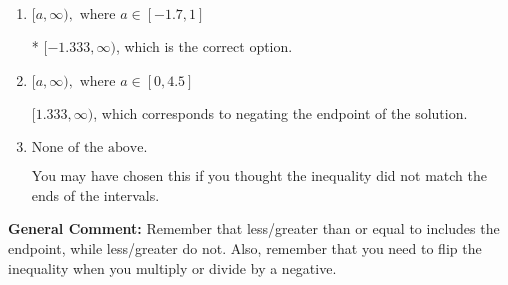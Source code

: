 \documentclass{extbook}[14pt]
\begin{document}
\begin{enumerate}
{\begin{enumerate}[label=\Alph*.]
 $(-\infty, -1.333]$, which corresponds to switching the direction of the interval. You likely did this if you did not flip the inequality when dividing by a negative!
\item \( [a, \infty), \text{ where } a \in [-1.7, 1] \)

* $[-1.333, \infty)$, which is the correct option.
\item \( [a, \infty), \text{ where } a \in [0, 4.5] \)

 $[1.333, \infty)$, which corresponds to negating the endpoint of the solution.
\item \( \text{None of the above}. \)

You may have chosen this if you thought the inequality did not match the ends of the intervals.
\end{enumerate}

\textbf{General Comment:} Remember that less/greater than or equal to includes the endpoint, while less/greater do not. Also, remember that you need to flip the inequality when you multiply or divide by a negative.
}
\end{enumerate}
\end{document}
